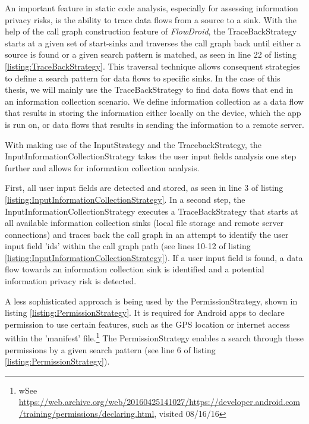 An important feature in static code analysis, especially for assessing information privacy risks, is the ability to trace data flows from a source to a sink.
With the help of the call graph construction feature of \textit{FlowDroid}, the TraceBackStrategy starts at a given set of start-sinks and traverses the call graph back until either a source is found or a given search pattern is matched, as seen in line 22 of listing \ref{listing:TraceBackStrategy}.
This traversal technique allows consequent strategies to define a search pattern for data flows to specific sinks.
In the case of this thesis, we will mainly use the TraceBackStrategy to find data flows that end in an information collection scenario. 
We define information collection as a data flow that results in storing the information either locally on the device, which the app is run on, or data flows that results in sending the information to a remote server.


With making use of the InputStrategy and the TracebackStrategy, the InputInformationCollectionStrategy takes the user input fields analysis one step further and allows for information collection analysis.

First, all user input fields are detected and stored, as seen in line 3 of listing \ref{listing:InputInformationCollectionStrategy}. 
In a second step, the InputInformationCollectionStrategy executes a TraceBackStrategy that starts at all available information collection sinks (local file storage and remote server connections) and traces back the call graph in an attempt to identify the user input field 'ids' within the call graph path (see lines 10-12 of listing \ref{listing:InputInformationCollectionStrategy}).
If a user input field is found, a data flow towards an information collection sink is identified and a potential information privacy risk is detected.

A less sophisticated approach is being used by the PermissionStrategy, shown in listing \ref{listing:PermissionStrategy}.
It is required for Android apps to declare permission to use certain features, such as the \acs{GPS} location or internet access within the 'manifest' file.\footnote{\raggedright wSee \url{https://web.archive.org/web/20160425141027/https://developer.android.com/training/permissions/declaring.html}, visited 08/16/16}
The PermissionStrategy enables a search through these permissions by a given search pattern (see line 6 of listing \ref{listing:PermissionStrategy}).


